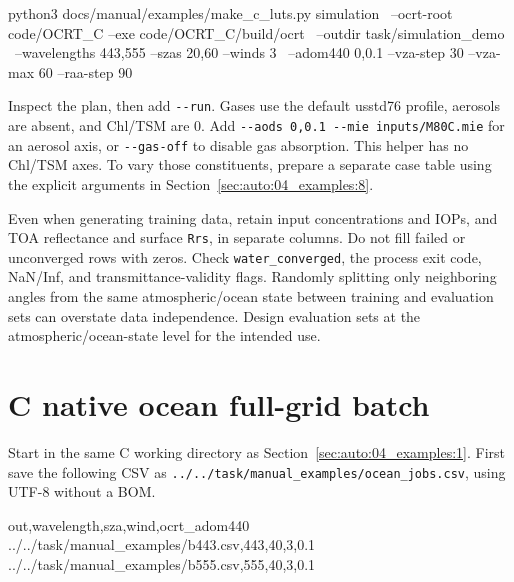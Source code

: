 \par\noindent\begin{minipage}{\linewidth}
\begin{ManualCode}
python3 docs/manual/examples/make_c_luts.py simulation \
  --ocrt-root code/OCRT_C --exe code/OCRT_C/build/ocrt \
  --outdir task/simulation_demo \
  --wavelengths 443,555 --szas 20,60 --winds 3 \
  --adom440 0,0.1 --vza-step 30 --vza-max 60 --raa-step 90
\end{ManualCode}
\end{minipage}\par

Inspect the plan, then add \texttt{-\allowbreak{}-\allowbreak{}run}. Gases use the default usstd76 profile, aerosols are absent, and Chl/TSM are 0. Add \texttt{-\allowbreak{}-\allowbreak{}aods 0,\allowbreak{}0.\allowbreak{}1 -\allowbreak{}-\allowbreak{}mie inputs/\allowbreak{}M80C.\allowbreak{}mie} for an aerosol axis, or \texttt{-\allowbreak{}-\allowbreak{}gas-\allowbreak{}off} to disable gas absorption. This helper has no Chl/TSM axes. To vary those constituents, prepare a separate case table using the explicit arguments in Section~\ref{sec:auto:04_examples:8}.

Even when generating training data, retain input concentrations and IOPs, and TOA reflectance and surface \texttt{Rrs}, in separate columns. Do not fill failed or unconverged rows with zeros. Check \texttt{water\_\allowbreak{}converged}, the process exit code, NaN/Inf, and transmittance-validity flags. Randomly splitting only neighboring angles from the same atmospheric/ocean state between training and evaluation sets can overstate data independence. Design evaluation sets at the atmospheric/ocean-state level for the intended use.

\Needspace{17\baselineskip}
\section{C native ocean full-grid batch}
\label{sec:auto:04_examples:12}
Start in the same C working directory as Section~\ref{sec:auto:04_examples:1}. First save the following CSV as \texttt{.\allowbreak{}.\allowbreak{}/\allowbreak{}.\allowbreak{}.\allowbreak{}/\allowbreak{}task/\allowbreak{}manual\_\allowbreak{}examples/\allowbreak{}ocean\_\allowbreak{}jobs.\allowbreak{}csv}, using UTF-8 without a BOM.


\par\noindent\begin{minipage}{\linewidth}
\begin{ManualCode}
out,wavelength,sza,wind,ocrt_adom440
../../task/manual_examples/b443.csv,443,40,3,0.1
../../task/manual_examples/b555.csv,555,40,3,0.1
\end{ManualCode}
\end{minipage}\par


